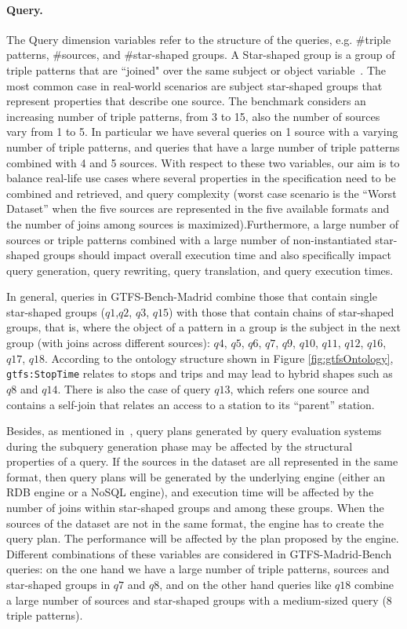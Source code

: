 \noindent\paragraph{\textbf{Query.}} The Query dimension variables refer to the structure of the queries, e.g. \#triple patterns, \#sources, and  \#star-shaped groups. A  Star-shaped group is a group of triple patterns that are ``joined" over the same subject or object variable~\citep{vidal2010efficient}. The most common case in real-world scenarios are subject star-shaped groups that represent properties that describe one source. The benchmark considers an increasing number of triple patterns, from 3 to 15, also the number of sources vary from 1 to 5. In particular we have several queries on 1 source with a varying number of triple patterns, and queries that have a large number of triple patterns combined with 4 and 5 sources. With respect to these two variables, our aim is to balance real-life use cases where several properties in the specification need to be combined and retrieved, and query complexity (worst case scenario is the ``Worst Dataset'' when the five sources are represented in the five available formats and the number of joins among sources is maximized).Furthermore, a large number of sources or triple patterns  combined with a large number of non-instantiated star-shaped groups should impact overall execution time and also specifically impact query generation, query rewriting, query translation, and query execution times. 

In general, queries in GTFS-Bench-Madrid combine those that contain single star-shaped groups ($q1$,$q2$, $q3$, $q15$) with those that contain chains of star-shaped groups, that is, where the object of a pattern in a group is the subject in the next group (with joins across different sources): $q4$, $q5$, $q6$, $q7$, $q9$, $q10$, $q11$, $q12$, $q16$, $q17$, $q18$. According to the ontology structure shown in Figure \ref{fig:gtfsOntology}, \texttt{gtfs:StopTime} relates to stops and trips and may lead to hybrid shapes such as $q8$ and $q14$. There is also the case of query $q13$, which refers one source and contains a self-join that relates an access to a station to its ``parent'' station.

Besides, as mentioned in~\citep{montoya2012benchmarking}, query plans generated by query evaluation systems during the subquery generation phase may be affected by the structural properties of a query. If the sources in the dataset are all represented in the same format, then query plans will be generated by the underlying engine (either an RDB engine or a NoSQL engine), and execution time will be affected by the number of joins within star-shaped groups and among these groups. When the sources of the dataset are not in the same format, the engine has to create the query plan. The performance will be affected by the plan proposed by the engine. Different combinations of these variables are considered in GTFS-Madrid-Bench queries: on the one hand we have a large number of triple patterns, sources and star-shaped groups in $q7$ and $q8$, and on the other hand queries like $q18$ combine a large number of sources and star-shaped groups with a medium-sized query (8 triple patterns).

